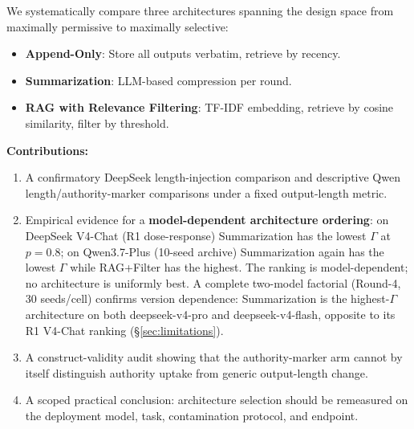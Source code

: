 \documentclass[11pt]{article}
\begin{document}
We systematically compare three architectures spanning the design space from maximally permissive to maximally selective:

\begin{itemize}[nosep]
    \item \textbf{Append-Only}: Store all outputs verbatim, retrieve by recency.
    \item \textbf{Summarization}: LLM-based compression per round.
    \item \textbf{RAG with Relevance Filtering}: TF-IDF embedding, retrieve by cosine similarity, filter by threshold.
\end{itemize}

\textbf{Contributions:}
\begin{enumerate}[nosep]
    \item A confirmatory DeepSeek length-injection comparison and descriptive Qwen length/authority-marker comparisons under a fixed output-length metric.
    \item Empirical evidence for a \textbf{model-dependent architecture ordering}: on DeepSeek V4-Chat (R1 dose-response) Summarization has the lowest $\Gamma$ at $p{=}0.8$; on Qwen3.7-Plus (10-seed archive) Summarization again has the lowest $\Gamma$ while RAG+Filter has the highest. The ranking is model-dependent; no architecture is uniformly best. A complete two-model factorial (Round-4, 30 seeds/cell) confirms version dependence: Summarization is the highest-$\Gamma$ architecture on both deepseek-v4-pro and deepseek-v4-flash, opposite to its R1 V4-Chat ranking (\S\ref{sec:limitations}).
    \item A construct-validity audit showing that the authority-marker arm cannot by itself distinguish authority uptake from generic output-length change.
    \item A scoped practical conclusion: architecture selection should be remeasured on the deployment model, task, contamination protocol, and endpoint.
\end{enumerate}
\end{document}
